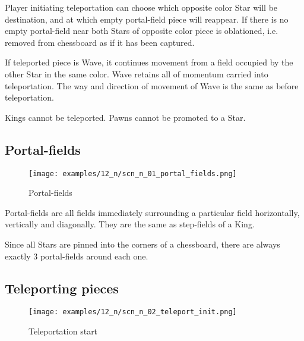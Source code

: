 Player initiating teleportation can choose which opposite color Star will be
destination, and at which empty portal-field piece will reappear. If there is no empty
portal-field near both Stars of opposite color piece is oblationed, i.e. removed from
chessboard as if it has been captured.

If teleported piece is Wave, it continues movement from a field occupied by the other
Star in the same color. Wave retains all of momentum carried into teleportation. The
way and direction of movement of Wave is the same as before teleportation.

Kings cannot be teleported. Pawns cannot be promoted to a Star.

\clearpage %

\subsection*{Portal-fields}
\label{sec:Nineteen/Star/Portal-fields}

\vspace*{-1.0\baselineskip}
\noindent
\begin{figure}[!h]
\texttt{[image: examples/12\_n/scn\_n\_01\_portal\_fields.png]}
\caption{Portal-fields}
\label{fig:scn_n_01_portal_fields}
\end{figure}

Portal-fields are all fields immediately surrounding a particular field
horizontally, vertically and diagonally. They are the same as step-fields
of a King.

Since all Stars are pinned into the corners of a chessboard, there are always
exactly 3 portal-fields around each one.

\clearpage %

\subsection*{Teleporting pieces}
\label{sec:Nineteen/Star/Teleporting pieces}

\vspace*{-1.5\baselineskip}
\noindent
\begin{figure}[!h]
\texttt{[image: examples/12\_n/scn\_n\_02\_teleport\_init.png]}
\vspace*{-1.3\baselineskip}
\caption{Teleportation start}
\label{fig:scn_n_02_teleport_init}
\end{figure}

